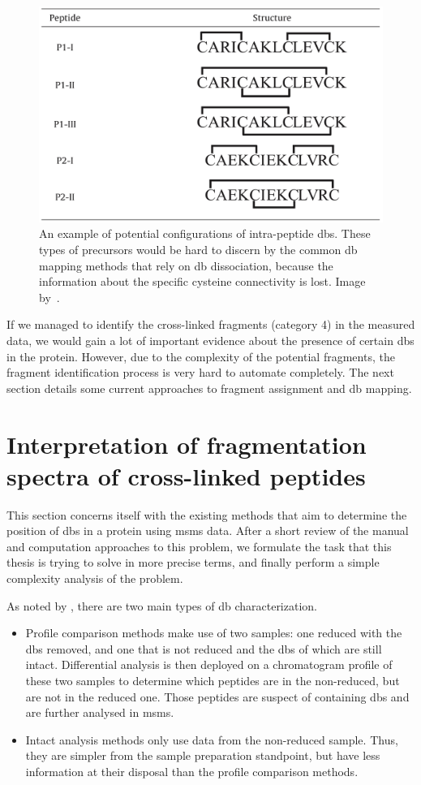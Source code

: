 \begin{figure}
  \centering
  \includegraphics[width=.5\linewidth]{img/intrapeptide-bond.jpeg}
  \caption{An example of potential configurations of intra-peptide \glspl*{db}. These types of precursors would be hard to discern by the common \gls*{db} mapping methods that rely on \gls*{db} dissociation, because the information about the specific cysteine connectivity is lost. Image by~\citet{durand2013tandem}.}\label{fig:intra-peptide-bonds}
\end{figure}

If we managed to identify the cross-linked fragments (category 4) in the measured data, we would gain a lot of important evidence about the presence of certain \glspl*{db} in the protein. However, due to the complexity of the potential fragments, the fragment identification process is very hard to automate completely. The next section details some current approaches to fragment assignment and \gls*{db} mapping.

\section{Interpretation of fragmentation spectra of cross-linked peptides}\label{sec:analysis}

This section concerns itself with the existing methods that aim to determine the position of \glspl*{db} in a protein using \gls*{msms} data. After a short review of the manual and computation approaches to this problem, we formulate the task that this thesis is trying to solve in more precise terms, and finally perform a simple complexity analysis of the problem.

As noted by \citet{lakbub2018recent}, there are two main types of \gls*{db} characterization.

\begin{itemize}
  \item Profile comparison methods make use of two samples: one reduced with the \glspl*{db} removed, and one that is not reduced and the \glspl*{db} of which are still intact. Differential analysis is then deployed on a chromatogram profile of these two samples to determine which peptides are in the non-reduced, but are not in the reduced one. Those peptides are suspect of containing \glspl*{db} and are further analysed in \gls*{msms}\@.
  \item Intact analysis methods only use data from the non-reduced sample. Thus, they are simpler from the sample preparation standpoint, but have less information at their disposal than the profile comparison methods.
\end{itemize}

